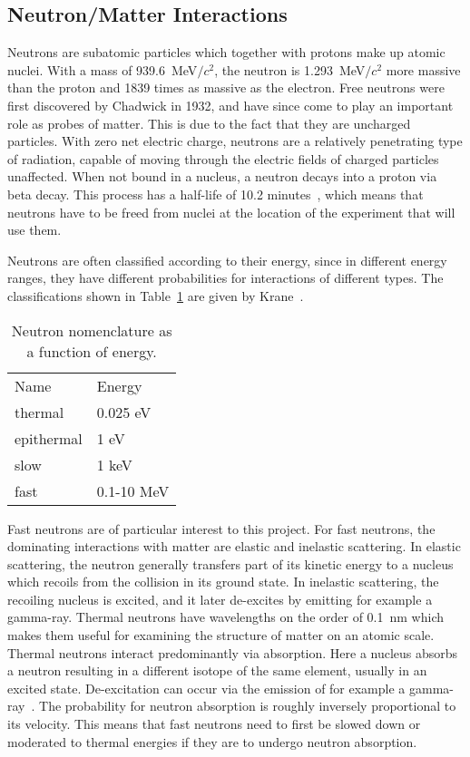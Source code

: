 \documentclass[main.tex]{subfiles}
\begin{document}
\subsection{Neutron/Matter Interactions}\label{sec:neutronMatterInteractions}
Neutrons are subatomic particles which together with protons make up atomic nuclei. With a mass of \SI{939.6}{\MeV}$/c^\textrm{2}$, the neutron is \SI{1.293}{\MeV}$/c^\textrm{2}$ more massive than the proton and 1839 times as massive as the electron. 
Free neutrons were first discovered by Chadwick in 1932, and have since come to play an important role as probes of matter. This is due to the fact that they are uncharged particles. With zero net electric charge, neutrons are a relatively penetrating type of radiation, capable of moving through the electric fields of charged particles unaffected. When not bound in a nucleus, a neutron decays into a proton via beta decay. This process has a half-life of 10.2 minutes~\cite{Nudat}, which means that neutrons have to be freed from nuclei at the location of the experiment that will use them.

Neutrons are often classified according to their energy, since in different energy ranges, they have different probabilities for interactions of different types. The classifications shown in Table~\ref{tab:neutron} are given by Krane~\cite{Krane}. 
\begin{table}[h]
\center
\begin{tabular}{|l|l|}
\hline
Name & Energy \\ \hhline{|=|=|}
thermal       & 0.025 eV        \\ \hline
epithermal    & 1 eV            \\ \hline
slow          & 1 keV           \\ \hline
fast          & 0.1-10 MeV      \\ \hline
\end{tabular}
\caption[Neutron nomenclature as a function of energy.]{Neutron nomenclature as a function of energy.}
\label{tab:neutron}
\end{table}
Fast neutrons are of particular interest to this project. For fast neutrons, the dominating interactions with matter are elastic and inelastic scattering. In elastic scattering, the neutron generally transfers part of its kinetic energy to a nucleus which recoils from the collision in its ground state. In inelastic scattering, the recoiling nucleus is excited, and it later de-excites by emitting for example a gamma-ray. Thermal neutrons have wavelengths on the order of \SI{0.1}{nm} which makes them useful for examining the structure of matter on an atomic scale. 
Thermal neutrons interact predominantly via absorption. Here a nucleus absorbs a neutron resulting in a different isotope of the same element, usually in an excited state. De-excitation can occur via the emission of for example a gamma-ray~\cite{Leo}. The probability for neutron absorption is roughly inversely proportional to its velocity. This means that fast neutrons need to first be slowed down or moderated to thermal energies if they are to undergo neutron absorption. 
\end{document}

